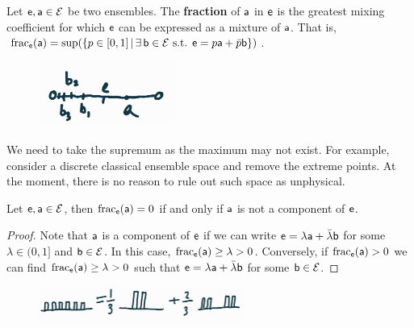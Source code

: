 \begin{mathSection}
	\begin{defn}
		Let $\ens, \ens[a] \in \Ens$ be two ensembles. The \textbf{fraction} of $\ens[a]$ in $\ens$ is the greatest mixing coefficient for which $\ens$ can be expressed as a mixture of $\ens[a]$. That is, $\size_{\ens}(\ens[a]) = \sup(\{ p \in [0,1] \, | \, \exists \, \ens[b] \in \Ens \text{ s.t. }  \ens = p \ens[a] + \bar{p} \ens[b] \})$.
	\end{defn}
\begin{figure}[H]
	\centering
	\includegraphics[width=0.4\textwidth]{tempimages/CapacitySupremum.jpg}
\end{figure}
	
	\begin{remark}
		We need to take the supremum as the maximum may not exist. For example, consider a discrete classical ensemble space and remove the extreme points. At the moment, there is no reason to rule out such space as unphysical.
	\end{remark}
	
	\begin{coro}
		Let $\ens, \ens[a] \in \Ens$, then $\size_{\ens}(\ens[a]) = 0$ if and only if $\ens[a]$ is not a component of $\ens$.
	\end{coro}
	
	\begin{proof}
		Note that $\ens[a]$ is a component of $\ens$ if we can write $\ens = \lambda \ens[a] + \bar{\lambda} \ens[b]$ for some $\lambda \in (0,1]$ and $\ens[b] \in \Ens$. In this case, $\size_{\ens}(\ens[a]) \geq \lambda > 0$. Conversely, if $\size_{\ens}(\ens[a]) > 0$ we can find $\size_{\ens}(\ens[a]) \geq \lambda > 0$ such that $\ens = \lambda \ens[a] + \bar{\lambda} \ens[b]$ for some $\ens[b] \in \Ens$.
	\end{proof}
\end{mathSection}

\begin{figure}[h]
	\centering
	\includegraphics[width=0.6\textwidth]{tempimages/FractionCapacity.jpg}
\end{figure}

